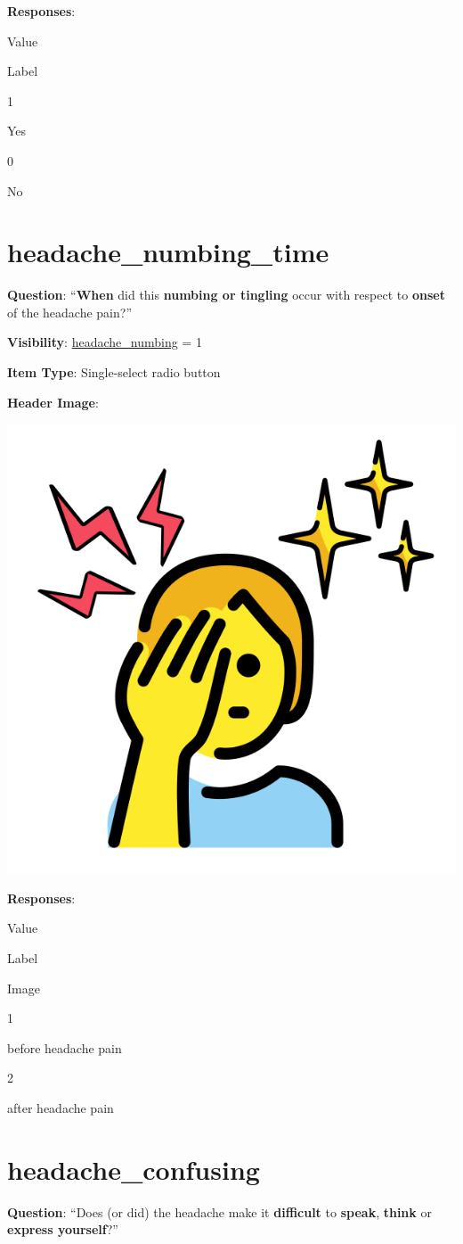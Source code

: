 \documentclass[]{book}
\begin{document}
\textbf{Responses}:

Value

Label

1

Yes

0

No

\hypertarget{headache_numbing_time}{%
\section{headache\_numbing\_time}\label{headache_numbing_time}}

\textbf{Question}: ``\textbf{When} did this \textbf{numbing or tingling} occur with respect to \textbf{onset} of the headache pain?''

\textbf{Visibility}: \protect\hyperlink{headache_numbing}{headache\_numbing} = 1

\textbf{Item Type}: Single-select radio button

\textbf{Header Image}:

\begin{flushleft}\includegraphics[width=0.33\linewidth]{downloadFigs4latex_NIMH_Applet_Codebook/headache_numbing_time_headerImg} \end{flushleft}

\textbf{Responses}:

Value

Label

Image

1

before headache pain

2

after headache pain

\hypertarget{headache_confusing}{%
\section{headache\_confusing}\label{headache_confusing}}

\textbf{Question}: ``Does (or did) the headache make it \textbf{difficult} to \textbf{speak}, \textbf{think} or \textbf{express yourself}?''
\end{document}
